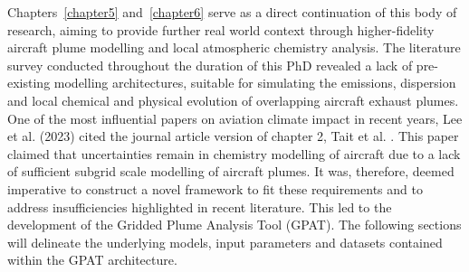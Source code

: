 Chapters~\ref{chapter5} and~\ref{chapter6} serve as a direct continuation of this body of research, aiming to provide further real world context through higher-fidelity aircraft plume modelling and local atmospheric chemistry analysis. The literature survey conducted throughout the duration of this PhD revealed a lack of pre-existing modelling architectures, suitable for simulating the emissions, dispersion and local chemical and physical evolution of overlapping aircraft exhaust plumes. One of the most influential papers on aviation climate impact in recent years, Lee et al. (2023) \cite{Lee2023} cited the journal article version of chapter 2, Tait et al. \cite{Tait2022}. This paper claimed that uncertainties remain in chemistry modelling of aircraft  due to a lack of sufficient subgrid scale modelling of aircraft plumes. It was, therefore, deemed imperative to construct a novel framework to fit these requirements and to address insufficiencies highlighted in recent literature. This led to the development of the Gridded Plume Analysis Tool (GPAT). The following sections will delineate the underlying models, input parameters and datasets contained within the GPAT architecture.

